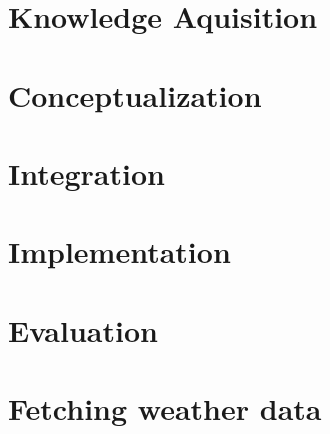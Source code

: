 \section{Knowledge Aquisition}

\section{Conceptualization}

\section{Integration}

\section{Implementation}

\section{Evaluation}

\section{Fetching weather data}
